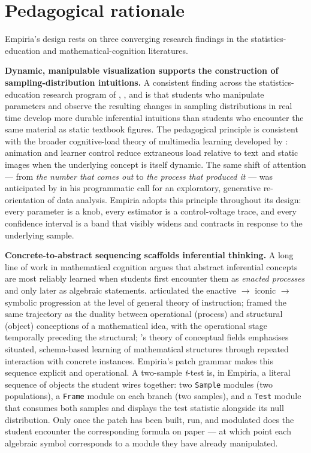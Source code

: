 \section{Pedagogical rationale}\label{pedagogical-rationale}

Empiria's design rests on three converging research findings in the
statistics-education and mathematical-cognition literatures.

\textbf{Dynamic, manipulable visualization supports the construction of
sampling-distribution intuitions.} A consistent finding across the
statistics-education research program of \citet{chance2004},
\citet{delmas2007}, and \citet{garfield2009} is that students who
manipulate parameters and observe the resulting changes in sampling
distributions in real time develop more durable inferential intuitions
than students who encounter the same material as static textbook
figures. The pedagogical principle is consistent with the broader
cognitive-load theory of multimedia learning developed by
\citet{mayer2009}: animation and learner control reduce extraneous load
relative to text and static images when the underlying concept is itself
dynamic. The same shift of attention --- from \emph{the number that
comes out} to \emph{the process that produced it} --- was anticipated by
\citet{tukey1962} in his programmatic call for an exploratory,
generative re-orientation of data analysis. Empiria adopts this
principle throughout its design: every parameter is a knob, every
estimator is a control-voltage trace, and every confidence interval is a
band that visibly widens and contracts in response to the underlying
sample.

\textbf{Concrete-to-abstract sequencing scaffolds inferential thinking.}
A long line of work in mathematical cognition argues that abstract
inferential concepts are most reliably learned when students first
encounter them as \emph{enacted processes} and only later as algebraic
statements. \citet{bruner1966} articulated the enactive $\rightarrow$ iconic $\rightarrow$
symbolic progression at the level of general theory of instruction;
\citet{sfard1991} framed the same trajectory as the duality between
operational (process) and structural (object) conceptions of a
mathematical idea, with the operational stage temporally preceding the
structural; \citet{vergnaud2009}'s theory of conceptual fields
emphasises situated, schema-based learning of mathematical structures
through repeated interaction with concrete instances. Empiria's patch
grammar makes this sequence explicit and operational. A two-sample
\emph{t}-test is, in Empiria, a literal sequence of objects the student
wires together: two \texttt{Sample} modules (two populations), a
\texttt{Frame} module on each branch (two samples), and a \texttt{Test}
module that consumes both samples and displays the test statistic
alongside its null distribution. Only once the patch has been built,
run, and modulated does the student encounter the corresponding formula
on paper --- at which point each algebraic symbol corresponds to a
module they have already manipulated.

